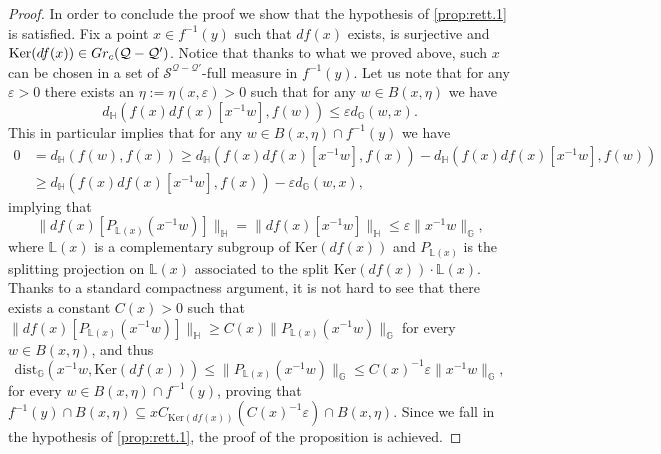 \documentclass[10pt, a4paper,
oneside, headinclude,footinclude]{scrartcl}
\begin{document}
\begin{proof}
In order to conclude the proof we show that the hypothesis of \cref{prop:rett.1} is satisfied. Fix a point $x\in f^{-1}(y)$ such that $df(x)$ exists, is surjective and $\mathrm{Ker}(df(x))\in Gr_c(\mathcal{Q}-\mathcal{Q}^\prime)$. Notice that thanks to what we proved above, such $x$ can be chosen in a set of $\mathcal{S}^{\mathcal{Q}-\mathcal{Q}'}$-full measure in $f^{-1}(y)$. Let us note that for any $\varepsilon>0$ there exists an $\eta:=\eta(x,\varepsilon)>0$ such that for any $w\in B(x,\eta)$ we have  
$$
d_{\mathbb{H}}(f(x)df(x)[x^{-1}w],f(w))\leq \varepsilon d_{\mathbb{G}}(w,x).
$$
This in particular implies that for any $w\in B(x,\eta)\cap f^{-1}(y)$ we have
\begin{equation}
    \begin{split}
        0&=d_{\mathbb{H}}(f(w),f(x))\geq d_{\mathbb{H}}(f(x)df(x)[x^{-1}w],f(x))-d_{\mathbb{H}}(f(x)df(x)[x^{-1}w],f(w))\\
        &\geq d_{\mathbb{H}}(f(x)df(x)[x^{-1}w],f(x))-\varepsilon d_{\mathbb{G}}(w,x),
        \nonumber
    \end{split}
\end{equation}
implying that
$$
\lVert df(x)[P_{\mathbb{L}(x)}(x^{-1}w)]\rVert_{\mathbb{H}}=\lVert df(x)[x^{-1}w]\rVert_{\mathbb{H}}\leq \varepsilon\lVert x^{-1}w\rVert_\mathbb{G},
$$
where $\mathbb{L}(x)$ is a complementary subgroup of $\mathrm{Ker}(df(x))$ and $P_{\mathbb{L}(x)}$ is the splitting projection on $\mathbb{L}(x)$ associated to the split $\mathrm{Ker}(df(x))\cdot \mathbb{L}(x)$. Thanks to a standard compactness argument, it is not hard to see that there exists a constant $C(x)>0$ such that $\lVert df(x)[P_{\mathbb{L}(x)}(x^{-1}w)]\rVert_{\mathbb H}\geq C(x)\lVert P_{\mathbb{L}(x)}(x^{-1}w)\rVert_{\mathbb G}$ for every $w\in B(x,\eta)$, and thus 
$$
\mathrm{dist}_\mathbb{G}(x^{-1}w, \mathrm{Ker}(df(x)))\leq \lVert P_{\mathbb{L}(x)}(x^{-1}w)\rVert_\mathbb{G}\leq C(x)^{-1}\varepsilon \lVert x^{-1}w\rVert_\mathbb{G},
$$
for every $w\in B(x,\eta)\cap f^{-1}(y)$, proving that $f^{-1}(y)\cap B(x,\eta)\subseteq xC_{\mathrm{Ker}(df(x))}(C(x)^{-1}\varepsilon)\cap B(x,\eta)$. Since we fall in the hypothesis of \cref{prop:rett.1}, the proof of the proposition is achieved.
\end{proof}
\end{document}
